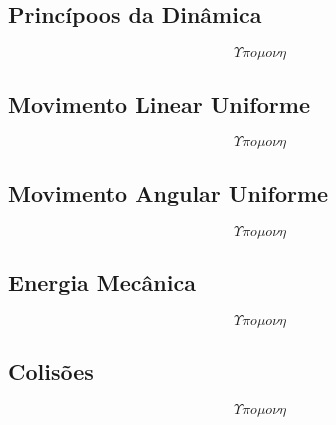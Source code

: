 \subsection{Princípoos da Dinâmica}
    \[ \Upsilon \pi o \mu o \nu \eta \]
\subsection{Movimento Linear Uniforme}
    \[ \Upsilon \pi o \mu o \nu \eta \]
\subsection{Movimento Angular Uniforme}
    \[ \Upsilon \pi o \mu o \nu \eta \]
\subsection{Energia Mecânica}
    \[ \Upsilon \pi o \mu o \nu \eta \]
\subsection{Colisões}
    \[ \Upsilon \pi o \mu o \nu \eta \]